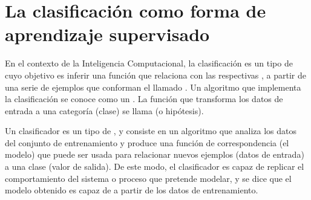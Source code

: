 %
%
%
\section{La clasificación como forma de aprendizaje supervisado}
%
En el contexto de la Inteligencia Computacional, la clasificación es
un tipo de  cuyo objetivo es
{inferir} una función que relaciona  con las
respectivas , a partir de una serie de ejemplos que
conforman el llamado .
Un algoritmo que implementa la clasificación se conoce como un
.
La función que transforma los datos de entrada a una categoría
(clase) se llama  (o {hipótesis}).

Un clasificador es un tipo de , y consiste
en un algoritmo que analiza los datos del conjunto de entrenamiento
y produce una función de correspondencia (el modelo) que puede ser
usada para relacionar nuevos ejemplos (datos de entrada) a una clase
(valor de salida).
De este modo, el clasificador es capaz de replicar el comportamiento
del sistema o proceso que pretende modelar, y se dice que el modelo
obtenido es capaz de  a partir de los datos de
entrenamiento.

